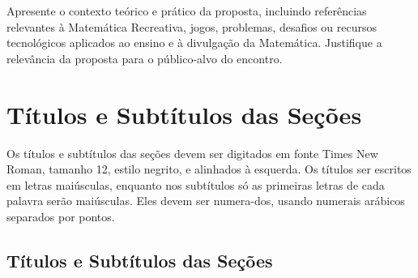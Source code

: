 \documentclass[12pt,oneside,a4paper]{article}
\begin{document}
Apresente o contexto teórico e prático da proposta, incluindo referências relevantes à Matemática Recreativa, jogos, problemas, desafios ou recursos tecnológicos aplicados ao ensino e à divulgação da Matemática. Justifique a relevância da proposta para o público-alvo do encontro.

%






\section{Títulos e Subtítulos das Seções}
Os títulos e subtítulos das seções devem ser digitados em fonte Times New Roman, tamanho 12, estilo negrito, e alinhados à esquerda. Os títulos ser escritos em letras maiúsculas, enquanto nos subtítulos só as primeiras letras de cada palavra serão maiúsculas. Eles devem ser numera-dos, usando numerais arábicos separados por pontos.

\subsection{Títulos e Subtítulos das Seções}
\end{document}
